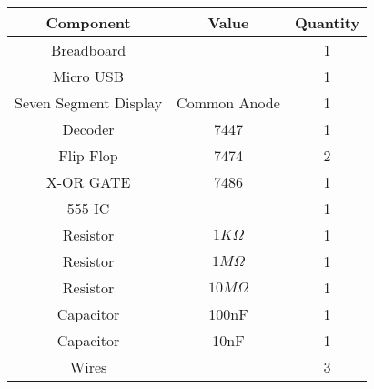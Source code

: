 \begin{tabular}{|c|c|c|}
\hline
\textbf{Component}	&\textbf{Value}	&\textbf{Quantity}\\
\hline
Breadboard	&	&1\\\hline
Micro USB       &       &1\\\hline
Seven Segment Display	&Common Anode	&1\\\hline
Decoder	&7447	&1\\\hline
Flip Flop	&7474	&2\\\hline
X-OR GATE	&7486	&1\\\hline
555 IC	&	&1\\\hline
Resistor	&$1K\Omega$	&1\\\hline
Resistor	&$1M\Omega$	&1\\\hline
Resistor        &$10M\Omega$    &1\\\hline
Capacitor	&100nF	&1\\\hline
Capacitor 	&10nF	&1\\\hline
Wires	&	&3\\\hline
\end{tabular}
